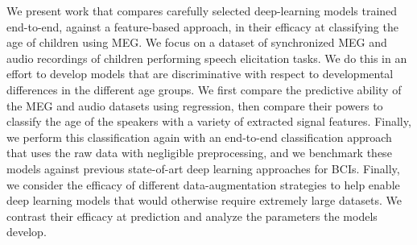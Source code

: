 \documentclass[utf8]{frontiersSCNS} %
\begin{document}
We present work that compares carefully selected deep-learning models trained end-to-end, against a feature-based approach, in their efficacy at classifying the age of children using MEG. We focus on a dataset of synchronized MEG and audio recordings of children performing speech elicitation tasks. We do this in an effort to develop models that are discriminative with respect to developmental differences in the different age groups. We first compare the predictive ability of the MEG and audio datasets using regression, then compare their powers to classify the age of the speakers with a variety of extracted signal features. Finally, we perform this classification again with an end-to-end classification approach that uses the raw data with negligible preprocessing, and we benchmark these models against previous state-of-art deep learning approaches for BCIs. Finally, we consider the efficacy of different data-augmentation strategies to help enable deep learning models that would otherwise require extremely large datasets. We contrast their efficacy at prediction and analyze the parameters the models develop. 





\end{document}
